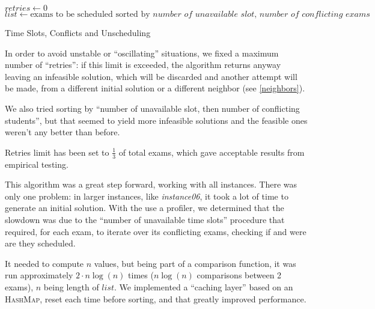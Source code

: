 \documentclass[11pt, a4paper, leqno]{article}
\begin{document}
	\begin{algorithm}[H]
		$retries \gets 0$\;
		$list \gets \text{exams to be scheduled sorted by }\textit{number of unavailable slot, number of conflicting exams}$\;
		\;
		\caption{Time Slots, Conflicts and Unscheduling}
	\end{algorithm}
	\newpage
	In order to avoid unstable or ``oscillating'' situations, we fixed a maximum number of ``retries'': if this limit is exceeded, the algorithm returns anyway leaving an infeasible solution, which will be discarded and another attempt will be made, from a different initial solution or a different neighbor (see \ref{neighbors}).
	
	We also tried sorting by ``number of unavailable slot, then number of conflicting students'', but that seemed to yield more infeasible solutions and the feasible ones weren't any better than before.
	
	Retries limit has been set to $\frac{1}{3}$ of total exams, which gave acceptable results from empirical testing.
	
	This algorithm was a great step forward, working with all instances. There was only one problem: in larger instances, like \textit{instance06}, it took a lot of time to generate an initial solution. With the use a profiler, we determined that the slowdown was due to the ``number of unavailable time slots'' procedure that required, for each exam, to iterate over its conflicting exams, checking if and were are they scheduled.
	
	It needed to compute $n$ values, but being part of a comparison function, it was run approximately $2\cdot n \log(n)$ times ($n \log(n)$ comparisons between 2 exams), $n$ being length of $list$. We implemented a ``caching layer'' based on an \textsc{HashMap}, reset each time before sorting, and that greatly improved performance.
	
\end{document}
